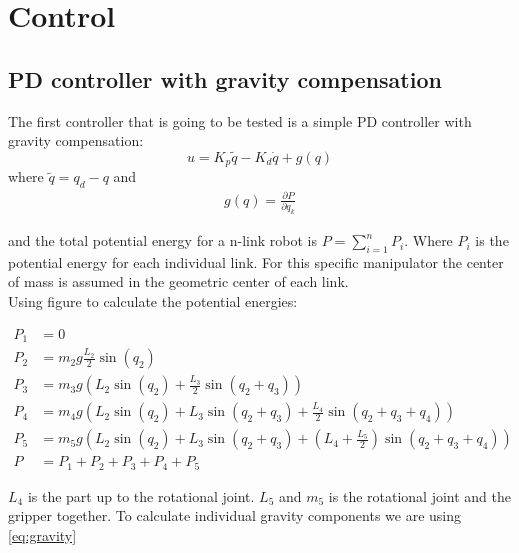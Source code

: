 \section*{Control}
\subsection*{PD controller with gravity compensation}
    The first controller that is going to be tested is a simple PD controller with gravity compensation:
    $$
        u=K_p\tilde{q} - K_d\dot{q} +g(q)
    $$
     where $\tilde{q} = q_d - q$ and 
     \begin{align}\label{eq:gravity}
     g(q) = \frac{\partial P}{\partial q_k}
     \end{align}

     
     and the total potential energy for a n-link robot is $P = \sum^n_{i=1}P_i$. Where $P_i$ is the potential energy for each individual link. For this specific manipulator the center of mass is assumed in the geometric center of each link. 
     \\
     Using figure  to calculate the potential energies:

     
     \begin{align*}
        P_1 &= 0
        \\
        P_2 &= m_2g\frac{L_2}{2}\sin{(q_2)}
        \\
        P_3 &= m_3g\left( L_2 \sin{(q_2)} + \frac{L_3}{2}\sin{(q_2 + q_3)} \right)
        \\
        P_4 &= m_4g\left( L_2 \sin{(q_2)} + L_3\sin{(q_2 + q_3)} + \frac{L_4}{2}\sin{(q_2+q_3+q_4)} \right)
        \\
        P_5 &= m_5g\left( L_2 \sin{(q_2)} + L_3\sin{(q_2 + q_3)} + \left(L_4 + \frac{L_5}{2} \right)\sin{(q_2+q_3+q_4)} \right)
        \\
        P &= P_1 + P_2 + P_3 + P_4 + P_5
     \end{align*}

     $L_4$ is the part up to the rotational joint. $L_5$ and $m_5$ is the rotational joint and the gripper together. To calculate individual gravity components we are using \eqref{eq:gravity}


